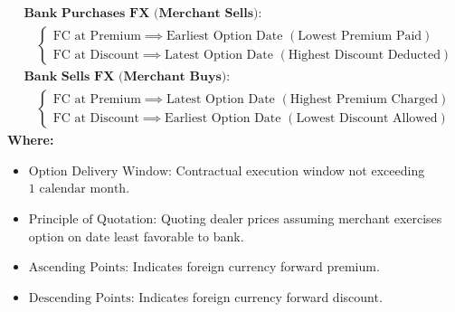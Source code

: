 \begin{formulabox}
\begin{align*}
    &\textbf{Bank Purchases FX (Merchant Sells):} \\
    &\quad \begin{cases}
        \text{FC at Premium} \implies \text{Earliest Option Date } (\text{Lowest Premium Paid}) \\
        \text{FC at Discount} \implies \text{Latest Option Date } (\text{Highest Discount Deducted})
    \end{cases} \\[0.4em]
    &\textbf{Bank Sells FX (Merchant Buys):} \\
    &\quad \begin{cases}
        \text{FC at Premium} \implies \text{Latest Option Date } (\text{Highest Premium Charged}) \\
        \text{FC at Discount} \implies \text{Earliest Option Date } (\text{Lowest Discount Allowed})
    \end{cases}
\end{align*}
\textbf{Where:}
\begin{itemize}[leftmargin=*, noitemsep]
    \item $\text{Option Delivery Window}$: Contractual execution window not exceeding $1 \text{ calendar month}$.
    \item $\text{Principle of Quotation}$: Quoting dealer prices assuming merchant exercises option on date least favorable to bank.
    \item $\text{Ascending Points}$: Indicates foreign currency forward premium.
    \item $\text{Descending Points}$: Indicates foreign currency forward discount.
\end{itemize}
\end{formulabox}


